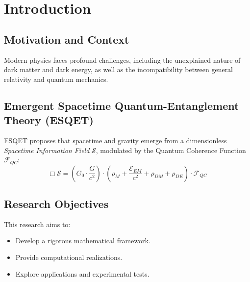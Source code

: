 \chapter{Introduction}

\section{Motivation and Context}
Modern physics faces profound challenges, including the unexplained nature of dark matter and dark energy, as well as the incompatibility between general relativity and quantum mechanics.

\section{Emergent Spacetime Quantum-Entanglement Theory (ESQET)}
ESQET proposes that spacetime and gravity emerge from a dimensionless \emph{Spacetime Information Field} \(\mathcal{S}\), modulated by the Quantum Coherence Function \(\mathcal{F}_{QC}\):
\[
\Box \mathcal{S} = \left( G_0 \cdot \frac{G}{c^2} \right) \cdot \left( \rho_M + \frac{\mathcal{E}_{EM}}{c^2} + \rho_{DM} + \rho_{DE} \right) \cdot \mathcal{F}_{QC}
\]

\section{Research Objectives}
This research aims to:
\begin{itemize}
\item Develop a rigorous mathematical framework.
\item Provide computational realizations.
\item Explore applications and experimental tests.
\end{itemize}

